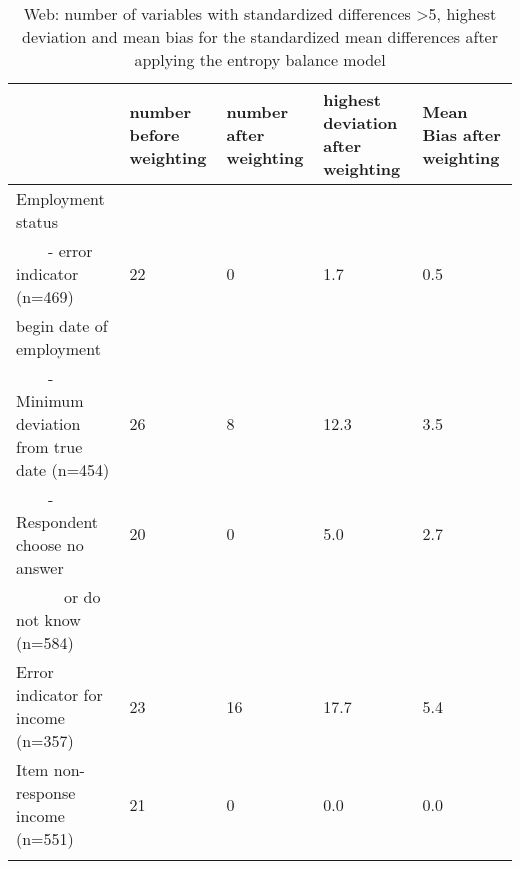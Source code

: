 \begin{table}[!h]
	\centering
	\caption{Web: number of variables with standardized differences \textgreater 5, highest deviation and mean bias for the standardized mean differences after applying the entropy balance model}
	\label{tab:standard WEB}
	\begin{tabularx}{\textwidth}{lXXXX}
		\addlinespace
		& number before weighting &number after weighting & highest deviation after weighting & Mean Bias after weighting\\                
		\midrule
		\addlinespace
		Employment status                                    	 				\\	 \addlinespace
		\ \ \ \ - error indicator (n=469)  &22&0&     1.7          &    0.5          \\ \addlinespace \addlinespace
		begin date of employment                        						&&            &   &  \\ \addlinespace
		\ \ \ \ - Minimum deviation from true date (n=454)         &26  &8&12.3&3.5		\\  \addlinespace
	\ \ \ \ - Respondent choose no answer             &20    &0&5.0&2.7		 \\ 
		\ \ \ \ \ \ or do not know (n=584)                      & 				&&& \\ \addlinespace \midrule \addlinespace
		Error indicator for income (n=357) &23                                	 		 &               	16&17.7&5.4 \\ \addlinespace
		Item non-response income (n=551) &21&               	0&0.0&0.0 \\ \addlinespace
		\bottomrule                         
	\end{tabularx}
\end{table}

